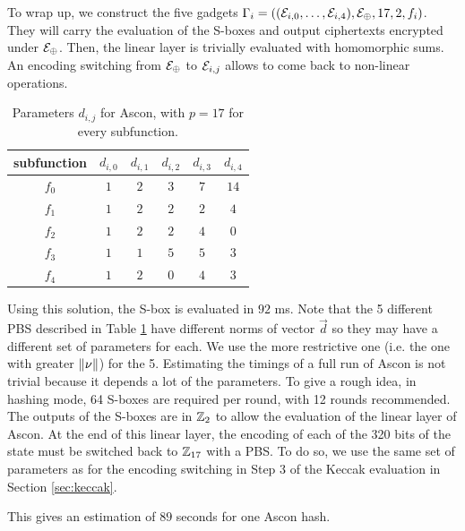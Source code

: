 To wrap up, we construct the five gadgets $\Gamma_i = \left ( (\mathcal{E}_{i,0}, \dots,  \mathcal{E}_{i, 4}), \mathcal{E}_\oplus, 17, 2, f_i \right )$. They will carry the evaluation of the \gls{S-box}es and output ciphertexts encrypted under $\mathcal{E}_\oplus$. Then, the linear layer is trivially evaluated with homomorphic sums. An encoding switching from $\mathcal{E}_\oplus$ to $\mathcal{E}_{i, j}$ allows to come back to non-linear operations.




\begin{table}[]
    \centering
    \begin{tabular}{|c|c|c|c|c|c|}
        \hline
       subfunction & $d_{i, 0}$ & $d_{i, 1}$ & $d_{i, 2}$ & $d_{i, 3}$ & $d_{i, 4}$\\
        \hline
        $f_0$  & $1$ & $2$ & $3$ & $7$ & $14$\\
        \hline
        $f_1$ & $1$ & $2$ & $2$ & $2$ & $4$\\
        \hline
        $f_2$ & $1$ & $2$ & $2$ & $4$ & $0$\\
        \hline
        $f_3$ & $1$ & $1$ & $5$ & $5$ & $3$\\
        \hline
        $f_4$ & $1$ & $2$ & $0$ & $4$ & $3$\\
        \hline
     \end{tabular}
    \caption{Parameters $d_{i, j}$ for Ascon, with $p=17$ for every subfunction.}
    \label{tab:encodings_ascon}
\end{table}


Using this solution, the \gls{S-box} is evaluated in $92$ ms. Note that the 5 different \gls{PBS} described in Table \ref{tab:encodings_ascon} have different norms of vector $\vec d$ so they may have a different set of parameters for each. We use the more restrictive one (i.e. the one with greater $\lVert \nu \rVert$) for the 5. Estimating the timings of a full run of Ascon is not trivial because it depends a lot of the parameters. To give a rough idea, in hashing mode, 64 \gls{S-box}es are required per round, with 12 rounds recommended. The outputs of the \gls{S-box}es are in $\mathbb{Z}_2$ to allow the evaluation of the linear layer of Ascon. At the end of this linear layer, the encoding of each of the 320 bits of the state must be switched back to $\mathbb{Z}_{17}$ with a \gls{PBS}. To do so, we use the same set of parameters as for the encoding switching in Step 3 of the Keccak evaluation in Section \ref{sec:keccak}.

This gives an estimation of $89$ seconds for one Ascon hash.

